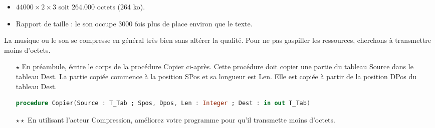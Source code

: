 \begin{reponse}
\begin{itemize}
\item $44000 \times 2 \times 3$ soit $264.000$ octets (264 ko).
\item Rapport de taille : le son occupe 3000 fois plus de place environ que le texte.
\end{itemize}
\end{reponse}




La musique ou le son se compresse en général très bien sans altérer la qualité.
Pour ne pas gaspiller les ressources, cherchons à transmettre moins d'octets.

\vfill

\iffalse
\begin{itemize}
\item[$\star$] En préambule, écrire le corps de la procédure Copier ci-après. Cette procédure doit copier une partie du tableau Source dans le tableau Dest.
  La partie copiée commence à la position SPos et sa longueur est Len. Elle est copiée à partir de la position DPos du tableau Dest.

  \begin{lstlisting}[language=Ada]
    procedure Copier(Source : T_Tab ; Spos, Dpos, Len : Integer ; Dest : in out T_Tab) 
  \end{lstlisting}
\vspace{-4ex}
\begin{center}
\end{center}
\vspace{-3ex}
  \item[$\star\star$] En utilisant l'acteur Compression, améliorez votre programme pour qu'il transmette moins d'octets.
\end{itemize}

